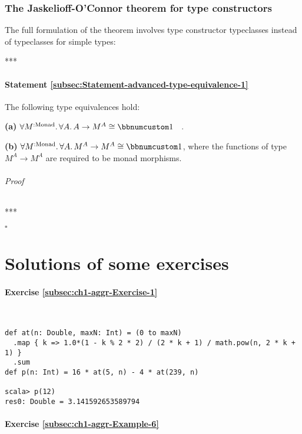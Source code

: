 \subsection{The Jaskelioff-O\textsf{'}Connor theorem for type constructors}

The full formulation of the theorem involves type constructor typeclasses
instead of typeclasses for simple types:

{*}{*}{*}

\subsubsection{Statement \label{subsec:Statement-advanced-type-equivalence-1}\ref{subsec:Statement-advanced-type-equivalence-1}}

The following type equivalences hold:

\textbf{(a)} $\forall M^{:\text{Monad}}.\,\forall A.\,A\rightarrow M^{A}\cong\bbnum 1\quad.$

\textbf{(b)} $\forall M^{:\text{Monad}}.\,\forall A.\,M^{A}\rightarrow M^{A}\cong\bbnum 1$,
where the functions of type $M^{A}\rightarrow M^{A}$ are required
to be monad morphisms.

\subparagraph{Proof}

{*}{*}{*}

$\square$

\chapter{Solutions of some exercises}


\subsubsection*{Exercise \ref{subsec:ch1-aggr-Exercise-1}}

~
\begin{lstlisting}
def at(n: Double, maxN: Int) = (0 to maxN)
  .map { k => 1.0*(1 - k % 2 * 2) / (2 * k + 1) / math.pow(n, 2 * k + 1) }
  .sum
def p(n: Int) = 16 * at(5, n) - 4 * at(239, n)

scala> p(12)
res0: Double = 3.141592653589794
\end{lstlisting}


\subsubsection*{Exercise \ref{subsec:ch1-aggr-Example-6}}

